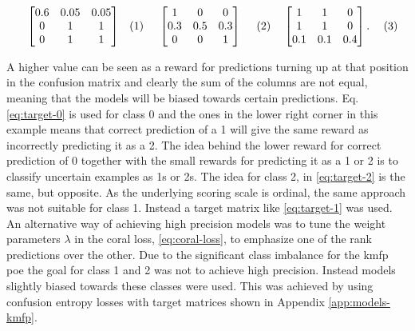 \noindent\begin{subequations}
\begin{minipage}{.33\textwidth}
  \begin{align}
  \label{eq:target-0}
  \begin{bmatrix}
    0.6 & 0.05 & 0.05 \\
    0 & 1 & 1\\
    0 & 1 & 1
  \end{bmatrix}
\end{align}
\end{minipage}%
\begin{minipage}{.33\textwidth}
  \begin{align}
  \label{eq:target-1}
  \begin{bmatrix}
    1 & 0 & 0 \\
    0.3 & 0.5 & 0.3\\
    0 & 0 & 1
  \end{bmatrix}
\end{align}
\end{minipage}%
\begin{minipage}{.33\textwidth}
  \begin{align}
  \label{eq:target-2}
  \begin{bmatrix}
    1 & 1 & 0 \\
    1 & 1 & 0 \\
    0.1 & 0.1 & 0.4
  \end{bmatrix}.
\end{align}
\end{minipage}
\label{eq:confusion-target}
\end{subequations}

A higher value can be seen as a reward for predictions turning up at that position in the confusion matrix and clearly the sum of the columns are not equal, meaning that the models will be biased towards certain predictions. Eq. \eqref{eq:target-0} is used for class 0 and the ones in the lower right corner in this example means that correct prediction of a 1 will give the same reward as incorrectly predicting it as a 2.
The idea behind the lower reward for correct prediction of 0 together with the small rewards for predicting it as a 1 or 2 is to classify uncertain examples as 1s or 2s. The idea for class 2, in \eqref{eq:target-2} is the same, but opposite. As the underlying scoring scale is ordinal, the same approach was not suitable for class 1. Instead a target matrix like \eqref{eq:target-1} was used. An alternative way of achieving high precision models was to tune the weight parameters $\lambda$ in the \gls{coral} loss, \eqref{eq:coral-loss}, to emphasize one of the rank predictions over the other.
Due to the significant class imbalance for the \gls{kmfp} \gls{poe} the goal for class 1 and 2 was not to achieve high precision. Instead models slightly biased towards these classes were used. This was achieved by using confusion entropy losses with target matrices shown in Appendix \ref{app:models-kmfp}.

